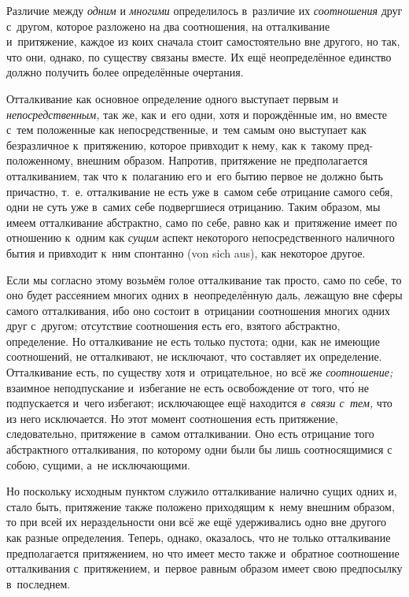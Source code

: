 
Различие между {\em одним} и {\em многими} определилось в~различие их
{\em соотношения} друг с~другом, которое разложено на два соотношения, на
отталкивание и~притяжение, каждое из коих сначала стоит самостоятельно вне
другого, но так, что они, однако, по существу связаны вместе. Их ещё
неопределённое единство должно получить более определённые очертания.

Отталкивание как основное определение одного выступает первым и
{\em непосредственным,} так же, как и~его одни, хотя и
порождённые им, но вместе с~тем положенные как непосредственные, и~тем
самым оно выступает как безразличное к~притяжению, которое привходит к
нему, как к~такому пред-положенному, внешним образом. Напротив, притяжение
не предполагается отталкиванием, так что к~полаганию его и~его бытию первое
не должно быть причастно, т.~е. отталкивание не есть уже в~самом себе
отрицание самого себя, одни не суть уже в~самих себе подвергшиеся
отрицанию. Таким образом, мы имеем отталкивание абстрактно, само по себе,
равно как и~притяжение имеет по отношению к~одним как
{\em сущим} аспект некоторого непосредственного наличного бытия и
привходит к~ним спонтанно (von sich aus), как некоторое другое.

Если мы согласно этому возьмём голое отталкивание так просто, само по себе,
то оно будет рассеянием многих одних в~неопределённую даль, лежащую вне
сферы самого отталкивания, ибо оно состоит в~отрицании соотношения многих
одних друг с~другом; отсутствие соотношения есть его, взятого абстрактно,
определение. Но отталкивание не есть только пустота; одни, как не имеющие
соотношений, не отталкивают, не исключают, что составляет их определение.
Отталкивание есть, по существу хотя и~отрицательное, но всё же
{\em соотношение;} взаимное неподпускание и~избегание
не есть освобождение от того, чт\'{о} не подпускается и~чего избегают;
исключающее ещё находится {\em в~связи с~тем,} что из
него исключается. Но этот момент соотношения есть притяжение,
следовательно, притяжение в~самом отталкивании. Оно есть отрицание того
абстрактного отталкивания, по которому одни были бы лишь соотносящимися с
собою, сущими, а~не исключающими.

Но поскольку исходным пунктом служило отталкивание налично сущих одних и,
стало быть, притяжение также положено приходящим к~нему внешним образом, то
при всей их нераздельности они всё же ещё удерживались одно вне другого как
разные определения. Теперь, однако, оказалось, что не только отталкивание
предполагается притяжением, но что имеет место также и~обратное соотношение
отталкивания с~притяжением, и~первое равным образом имеет свою предпосылку
в~последнем.

